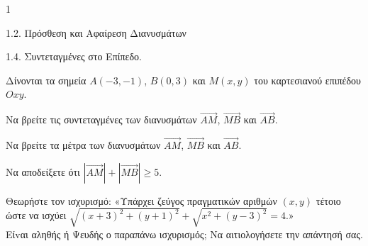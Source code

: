 \begin{ylh}{1}
    \item 1.2. Πρόσθεση και Αφαίρεση Διανυσμάτων
    \item 1.4. Συντεταγμένες στο Επίπεδο.
\end{ylh}
Δίνονται τα σημεία $A(-3, -1)$, $B(0, 3)$ και $M(x, y)$ του καρτεσιανού επιπέδου $Oxy$.
\begin{alist}
\item Να βρείτε τις συντεταγμένες των διανυσμάτων $\overrightarrow{AM}$, $\overrightarrow{MB}$ και $\overrightarrow{AB}$. 
\item Να βρείτε τα μέτρα των διανυσμάτων $\overrightarrow{AM}$, $\overrightarrow{MB}$ και $\overrightarrow{AB}$. 
\item Να αποδείξετε ότι $|\overrightarrow{AM}| + |\overrightarrow{MB}| \geq 5$. 
\item Θεωρήστε τον ισχυρισμό: «Υπάρχει ζεύγος πραγματικών αριθμών $(x,y)$ τέτοιο ώστε να ισχύει $\sqrt{(x + 3)^2+(y + 1)^2} + \sqrt{x^2+(y - 3)^2} = 4$.»\\ Είvαι αληθής ή Ψευδής ο παραπάνω ισχυρισμός; Να αιτιολογήσετε την απάντησή σας. 
\end{alist}